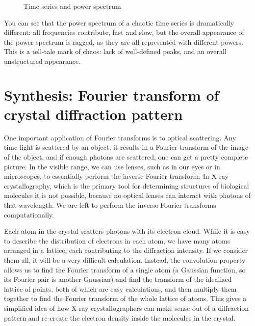 \documentclass[
  letterpaper,
  DIV=11,
  numbers=noendperiod]{scrreprt}
\begin{document}
\begin{figure}
\begin{minipage}{0.50\linewidth}
{}


\end{minipage}%

\caption{\label{fig-log-map-38}Time series and power spectrum}

\end{figure}%

You can see that the power spectrum of a chaotic time series is
dramatically different: all frequencies contribute, fast and slow, but
the overall appearance of the power spectrum is ragged, as they are all
represented with different powers. This is a tell-tale mark of chaos:
lack of well-defined peaks, and an overall unstructured appearance.

\section{Synthesis: Fourier transform of crystal diffraction
pattern}\label{synthesis-fourier-transform-of-crystal-diffraction-pattern}

One important application of Fourier transforms is to optical
scattering. Any time light is scattered by an object, it results in a
Fourier transform of the image of the object, and if enough photons are
scattered, one can get a pretty complete picture. In the visible range,
we can use lenses, such as in our eyes or in microscopes, to essentially
perform the inverse Fourier transform. In X-ray crystallography, which
is the primary tool for determining structures of biological molecules
it is not possible, because no optical lenses can interact with photons
of that wavelength. We are left to perform the inverse Fourier
transforms computationally.

Each atom in the crystal scatters photons with its electron cloud. While
it is easy to describe the distribution of electrons in each atom, we
have many atoms arranged in a lattice, each contributing to the
diffraction intensity. If we consider them all, it will be a very
difficult calculation. Instead, the convolution property allows us to
find the Fourier transform of a single atom (a Gaussian function, so its
Fourier pair is another Gaussian) and find the transform of the
idealized lattice of points, both of which are easy calculations, and
then multiply them together to find the Fourier transform of the whole
lattice of atoms. This gives a simplified idea of how X-ray
crystallographers can make sense out of a diffraction pattern and
re-create the electron density inside the molecules in the crystal.
\end{document}
